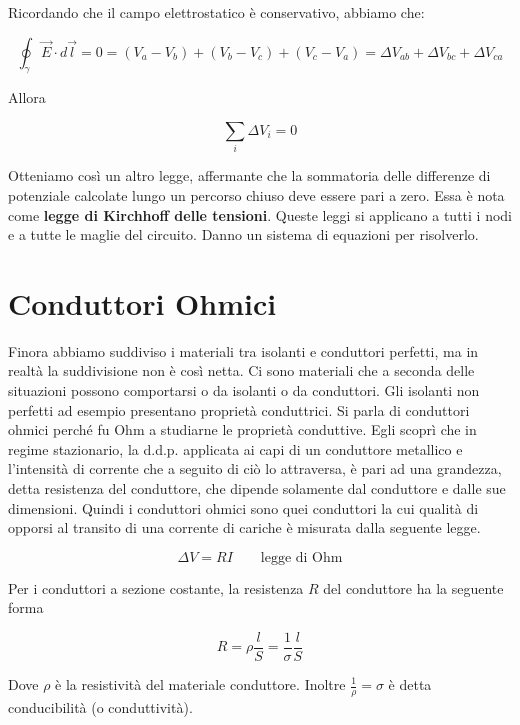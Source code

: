 Ricordando che il campo elettrostatico è conservativo, abbiamo che:

\[
	\oint_{\gamma} \vec{E} \cdot d\vec{l} = 0 = (V_a-V_b  ) + (V_b-V_c  )+ (V_c-V_a  ) = \Delta V_{ab} + \Delta V_{bc} + \Delta V_{ca}
\]

Allora

\[
	\boxed{\sum_i \Delta V_i=0}
\]

Otteniamo così un altro legge, affermante che la sommatoria delle differenze di potenziale calcolate lungo un percorso chiuso deve essere pari a zero. Essa è nota come \textbf{legge di Kirchhoff delle tensioni}.
Queste leggi si applicano a tutti i nodi e a tutte le maglie del circuito. Danno un sistema di equazioni per risolverlo.

\section{Conduttori Ohmici}

Finora abbiamo suddiviso i materiali tra isolanti e conduttori perfetti, ma in realtà la suddivisione non è così netta. Ci sono materiali che a seconda delle situazioni possono comportarsi o da isolanti o da conduttori. Gli isolanti non perfetti ad esempio presentano proprietà conduttrici. Si parla di conduttori ohmici perché fu Ohm a studiarne le proprietà conduttive. Egli scoprì che in regime stazionario, la d.d.p. applicata ai capi di un conduttore metallico e l'intensità di corrente che a seguito di ciò lo attraversa, è pari ad una grandezza, detta resistenza del conduttore, che dipende solamente dal conduttore e dalle sue dimensioni. Quindi i conduttori ohmici sono quei conduttori la cui qualità di opporsi al transito di una corrente di cariche è misurata dalla seguente legge.

\[
	\boxed{\Delta V= RI} \qquad \text{legge di Ohm}
\]

Per i conduttori a sezione costante, la resistenza $ R $ del conduttore ha la seguente forma

\[
	R = \rho \frac{l}{S} = \frac{1}{\sigma}\frac{l}{S}
\]

Dove $ \rho $ è la resistività del materiale conduttore.
Inoltre $ \frac{1}{\rho}= \sigma $ è detta conducibilità (o conduttività).

